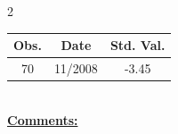 
\bigskip 
\begin{multicols}{2}{ 
\begin{tabular}{ccc}
\hline  Obs.  &  Date &  Std. Val. \\ 
\hline 
                       70 &       11/2008 &         -3.45 \vspace{-.12in} \\  
 \end{tabular} 
\\ 
 \columnbreak 
 \singlespacing 
 \underline{\textbf{Comments:}} \\ 
 \bigskip       

 } 
\end{multicols} 
